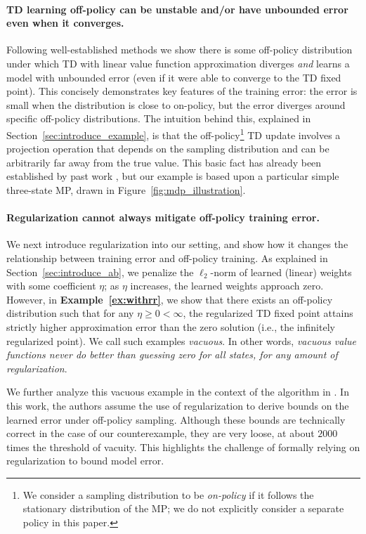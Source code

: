 \paragraph{TD learning off-policy can be unstable and/or have unbounded error even when it converges.}
Following well-established methods we show there is some off-policy distribution under which TD with linear value function approximation diverges \emph{and} learns a model with unbounded error (even if it were able to converge to the TD fixed point). This concisely demonstrates key features of the training error: the error is small when the distribution is close to on-policy, but the error diverges around specific off-policy distributions.  The intuition behind this, explained in Section~\ref{sec:introduce_example}, is that the off-policy\footnote{We consider a sampling distribution to be \emph{on-policy} if it follows the stationary distribution of the MP; we do not explicitly consider a separate policy in this paper. } TD update involves a projection operation that depends on the sampling distribution and can be arbitrarily far away from the true value.  This basic fact has already been established by past work \cite{baird1993counterexample,kolter2011fixed}, but our example is based upon a particular simple three-state MP, drawn in Figure~\ref{fig:mdp_illustration}.

\paragraph{Regularization cannot always mitigate off-policy training error. }
We next introduce regularization into our setting, and show how it changes the relationship between training error and off-policy training. As explained in Section~\ref{sec:introduce_ab}, we penalize the $\ell_2$-norm of learned (linear) weights with some coefficient $\eta$; as $\eta$ increases, the learned weights approach zero.  However, in \textbf{Example~\ref{ex:withrr}}, we show that there exists an off-policy distribution such that for any $\eta \geq 0 < \infty$, the regularized TD fixed point attains strictly higher approximation error than the zero solution (i.e., the infinitely regularized point).  We call such examples \emph{vacuous}. In other words, \emph{vacuous value functions never do better than guessing zero for all states, for any amount of regularization}.

We further analyze this vacuous example in the context of the algorithm in \citep{zhang2021breaking}. In this work, the authors assume the use of regularization to derive bounds on the learned error under off-policy sampling. Although these bounds are technically correct in the case of our counterexample, they are very loose, at about $2000$ times the threshold of vacuity.  This highlights the challenge of formally relying on regularization to bound model error.

